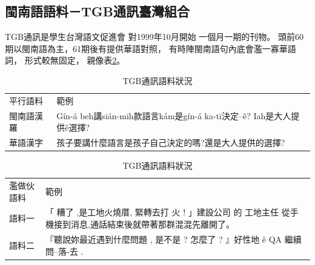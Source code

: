 \subsection{閩南語語料－TGB通訊臺灣組合}
\label{節：TGB通訊－臺灣組合}
TGB通訊\cite{TGB通訊}是學生台灣語文促進會
對1999年10月開始\cite{學生台灣語文促進會對1999年10月開始}
一個月一期的刊物。
頭前60期以閩南語為主，61期後有提供華語對照，
有時陣閩南語句內底會濫一寡華語詞，
形式較無固定，
親像表\ref{表：TGB通訊閩南語、華語對照}。


\begin{table}
\caption{TGB通訊語料狀況}
\label{表：TGB通訊閩南語、華語對照}
\centering
\begin{tabular}{lp{30em}}
平行語料 & 範例 \\
閩南語漢羅 & Gín-á beh講sián-mih款語言kám是gín-á ka-tī決定--ê? Iah是大人提供ê選擇? \\
華語漢字 & 孩子要講什麼語言是孩子自己決定的嗎?還是大人提供的選擇? \\
\hline
\end{tabular}
\begin{tabular}{lp{30em}}
濫做伙語料 & 範例 \\
語料一 & 「 糟了 ,是工地火燒厝, 緊轉去打 火 ! 」建設公司 的 工地主任 從手機接到消息,通話結束後就帶著那群混混先離開了。 \\
語料二 & 『聽說妳最近遇到什麼問題 , 是不是 ? 怎麼了 ? 』好性地 ê QA 繼續問--落-去 . \\
\end{tabular}
\end{table}

%
%
%
%


